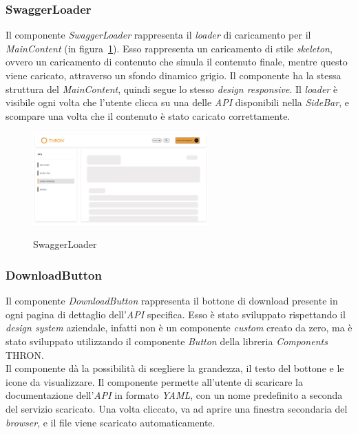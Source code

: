 \subsubsection{SwaggerLoader}\label{subsubsec:swagger-loader}
Il componente \textit{SwaggerLoader} rappresenta il \textit{loader} di caricamento per il \textit{MainContent} (in figura~\ref{fig:swagger-loader}). 
Esso rappresenta un caricamento di stile \textit{skeleton}, ovvero un caricamento di contenuto che simula il contenuto finale, mentre questo viene caricato, attraverso un sfondo dinamico grigio.
Il componente ha la stessa struttura del \textit{MainContent}, quindi segue lo stesso \textit{design responsive}.
Il \textit{loader} è visibile ogni volta che l'utente clicca su una delle \textit{API} disponibili nella \textit{SideBar}, e scompare una volta che il contenuto è stato caricato correttamente.

\begin{figure}[ht]
  \centering
  \includegraphics[width=0.6\textwidth, alt={Skeleton loader di caricamento per contenuto principale}]{images/frontend/SwaggerLoader.jpg}
  \caption{SwaggerLoader}\label{fig:swagger-loader}
\end{figure}

\subsubsection{DownloadButton}\label{subsubsec:download-button}
Il componente \textit{DownloadButton} rappresenta il bottone di download presente in ogni pagina di dettaglio dell'\textit{API} specifica. Esso è stato sviluppato rispettando il \textit{design system}
aziendale, infatti non è un componente \textit{custom} creato da zero, ma è stato sviluppato utilizzando il componente \textit{Button} della libreria \textit{Components} THRON.\\
Il componente dà la possibilità di scegliere la grandezza, il testo del bottone e le icone da visualizzare.
Il componente permette all'utente di scaricare la documentazione dell'\textit{API} in formato \textit{YAML}, con un nome predefinito a seconda 
del servizio scaricato. Una volta cliccato, va ad aprire una finestra secondaria del \textit{browser}, e il file viene scaricato automaticamente.\\

